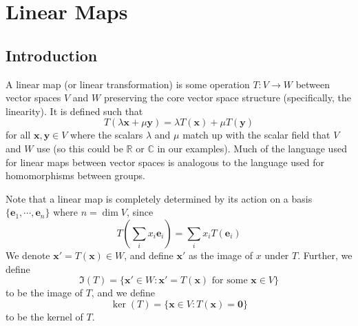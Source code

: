 \documentclass{article}
\begin{document}
\section{Linear Maps}
\subsection{Introduction}
A linear map (or linear transformation) is some operation $T: V \to W$ between vector spaces $V$ and $W$ preserving the core vector space structure (specifically, the linearity). It is defined such that
\[ T\left(\lambda \bm x + \mu \bm y\right) = \lambda T(\bm x) + \mu T(\bm y) \]
for all $\bm x, \bm y \in V$ where the scalars $\lambda$ and $\mu$ match up with the scalar field that $V$ and $W$ use (so this could be $\mathbb R$ or $\mathbb C$ in our examples). Much of the language used for linear maps between vector spaces is analogous to the language used for homomorphisms between groups.

Note that a linear map is completely determined by its action on a basis $\{ \bm e_1, \cdots, \bm e_n \}$ where $n = \dim V$, since
\[ T\left(\sum_i x_i \bm e_i \right) = \sum_i x_i T(\bm e_i) \]
We denote $\bm x' = T(\bm x) \in W$, and define $\bm x'$ as the image of $x$ under $T$. Further, we define
\[ \Im (T) = \{ \bm x' \in W : \bm x' =T(\bm x) \text{ for some } \bm x \in V \} \]
to be the image of $T$, and we define
\[ \ker (T) = \{ \bm x \in V : T(\bm x) = \bm 0 \} \]
to be the kernel of $T$.
\end{document}
